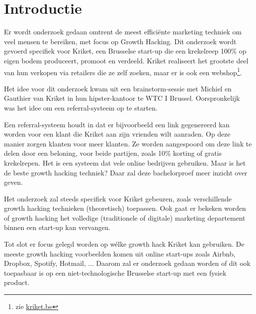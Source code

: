 
\section{Introductie} %
\label{sec:introductie}

Er wordt onderzoek gedaan omtrent de meest efficiënte marketing techniek om veel mensen te bereiken, met focus op Growth Hacking. Dit onderzoek wordt gevoerd specifiek voor Kriket, een Brusselse start-up die een krekelreep 100\% op eigen bodem produceert, promoot en verdeeld. Kriket realiseert het grootste deel van hun verkopen via retailers die ze zelf zoeken, maar er is ook een webshop\footnote{zie \href{https://kriket.be}{kriket.be}}.

Het idee voor dit onderzoek kwam uit een brainstorm-sessie met Michiel en Gauthier van Kriket in hun hipster-kantoor te WTC I Brussel. Oorspronkelijk was het idee om een referral-systeem op te starten. 

Een referral-systeem houdt in dat er bijvoorbeeld een link gegenereerd kan worden voor een klant die Kriket aan zijn vrienden wilt aanraden. Op deze manier zorgen klanten voor meer klanten. Ze worden aangespoord om deze link te delen door een beloning, voor beide partijen, zoals 10\% korting of gratis krekelrepen. Het is een systeem dat vele online bedrijven gebruiken. Maar is het de beste growth hacking techniek? Daar zal deze bachelorproef meer inzicht over geven.

Het onderzoek zal steeds specifiek voor Kriket gebeuren, zoals verschillende growth hacking technieken (theoretisch) toepassen. Ook gaat er bekeken worden of growth hacking het volledige (traditionele of digitale) marketing departement binnen een start-up kan vervangen.

Tot slot er focus gelegd worden op wélke growth hack Kriket kan gebruiken. De meeste growth hacking voorbeelden komen uit online start-ups zoals Airbnb, Dropbox, Spotify, Hotmail, ... Daarom zal er onderzoek gedaan worden of dit ook toepasbaar is op een niet-technologische Brusselse start-up met een fysiek product.


